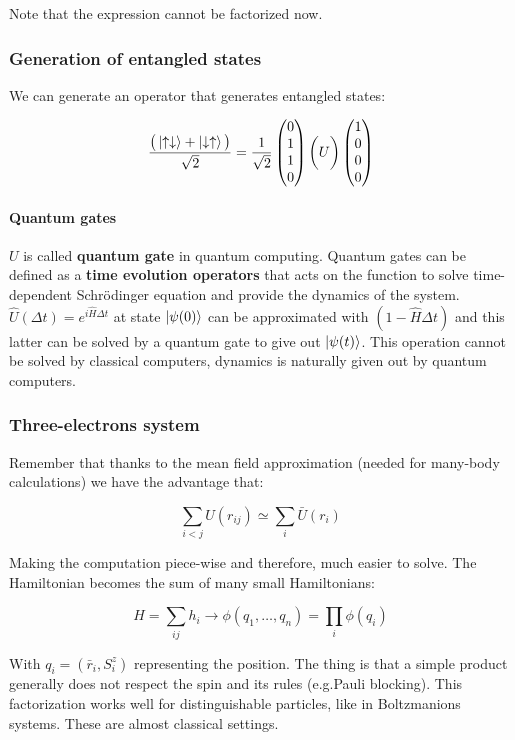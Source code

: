 			Note that the expression cannot be factorized now.

		\subsubsection{Generation of entangled states}
		We can generate an operator that generates entangled states:

		$$\frac{\big(\ket{\uparrow\downarrow}+\ket{\downarrow\uparrow}\big)}{\sqrt{2}}=\frac{1}{\sqrt{2}}\begin{pmatrix}0\\1\\1\\0\end{pmatrix}\bigg(U\bigg)\begin{pmatrix}1\\0\\0\\0\end{pmatrix}$$

			\paragraph{Quantum gates}
			$U$ is called \textbf{quantum gate} in quantum computing.
			Quantum gates can be defined as a \textbf{time evolution operators} that acts on the function to solve time-dependent Schr\"odinger equation and provide the dynamics of the system.
			$\hat{U}(\Delta t) = e^{i\hat{H}\Delta t}$ at state $\ket{\psi(0)}$ can be approximated with $(1-\hat{H}\Delta t)$ and this latter can be solved by a quantum gate to give out $\ket{\psi(t)}$.
			This operation cannot be solved by classical computers, dynamics is naturally given out by quantum computers.

		\subsubsection{Three-electrons system}
		Remember that thanks to the mean field approximation (needed for many-body calculations) we have the advantage that:

		$$\sum_{i<j} U(r_{ij}) \simeq \sum_i \bar{U}(r_i)$$

		Making the computation piece-wise and therefore, much easier to solve.
		The Hamiltonian becomes the sum of many small Hamiltonians:

		$$H = \sum_{ij} h_i \rightarrow \phi(q_1, \dots, q_n) = \prod_i \phi(q_i)$$

		With $q_i = (\bar{r}_i, S^z_i)$ representing the position.
		The thing is that a simple product generally does not respect the spin and its rules (e.g.Pauli blocking).
		This factorization works well for distinguishable particles, like in Boltzmanions systems.
		These are almost classical settings.

